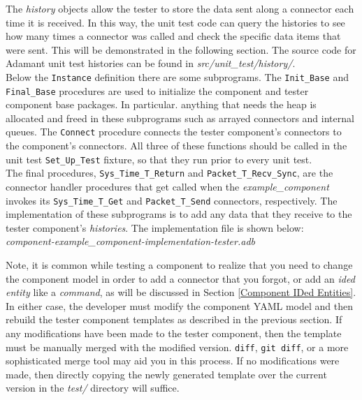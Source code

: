 The \textit{history} objects allow the tester to store the data sent along a connector each time it is received. In this way, the unit test code can query the histories to see how many times a connector was called and check the specific data items that were sent. This will be demonstrated in the following section. The source code for Adamant unit test histories can be found in \textit{src/unit\_test/history/}. \\

Below the \texttt{Instance} definition there are some subprograms. The \texttt{Init\_Base} and \texttt{Final\_Base} procedures are used to initialize the component and tester component base packages. In particular. anything that needs the heap is allocated and freed in these subprograms such as arrayed connectors and internal queues. The \texttt{Connect} procedure connects the tester component's connectors to the component's connectors. All three of these functions should be called in the unit test \texttt{Set\_Up\_Test} fixture, so that they run prior to every unit test. \\

The final procedures, \texttt{Sys\_Time\_T\_Return} and \texttt{Packet\_T\_Recv\_Sync}, are the connector handler procedures that get called when the \textit{example\_component} invokes its \texttt{Sys\_Time\_T\_Get} and \texttt{Packet\_T\_Send} connectors, respectively. The implementation of these subprograms is to add any data that they receive to the tester component's \textit{histories}. The implementation file is shown below: \\

\textit{component-example\_component-implementation-tester.adb}

Note, it is common while testing a component to realize that you need to change the component model in order to add a connector that you forgot, or add an \textit{ided entity} like a \textit{command}, as will be discussed in Section \ref{Component IDed Entities}. In either case, the developer must modify the component YAML model and then rebuild the tester component templates as described in the previous section. If any modifications have been made to the tester component, then the template must be manually merged with the modified version. \texttt{diff}, \texttt{git diff}, or a more sophisticated merge tool may aid you in this process. If no modifications were made, then directly copying the newly generated template over the current version in the \textit{test/} directory will suffice. \\

